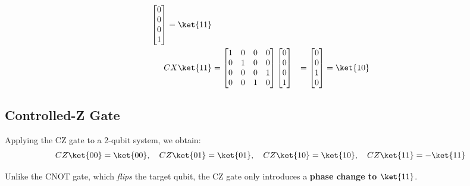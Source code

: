 \begin{equation*}
\begin{aligned}
\begin{bmatrix}
      0 \\ 0 \\ 0 \\ 1
    \end{bmatrix} = \ket{11} \\
    CX \ket{11} & = \begin{bmatrix}
      1 & 0 & 0 & 0 \\
      0 & 1 & 0 & 0 \\
      0 & 0 & 0 & 1 \\
      0 & 0 & 1 & 0
      \end{bmatrix} \begin{bmatrix}
      0 \\ 0 \\ 0 \\ 1
      \end{bmatrix} & = \begin{bmatrix}
      0 \\ 0 \\ 1 \\ 0
    \end{bmatrix} = \ket{10}
  \end{aligned}
\end{equation*}

\subsection*{Controlled-Z Gate}



Applying the CZ gate to a 2-qubit system, we obtain:
\[
  CZ \ket{00} = \ket{00}, \quad
  CZ \ket{01} = \ket{01}, \quad
  CZ \ket{10} = \ket{10}, \quad
  CZ \ket{11} = -\ket{11}
\]

\noindent
Unlike the CNOT gate, which \textit{flips} the target qubit, the CZ gate only
introduces a \textbf{phase change to $\ket{11}$}.

\vspace{0.3cm}

